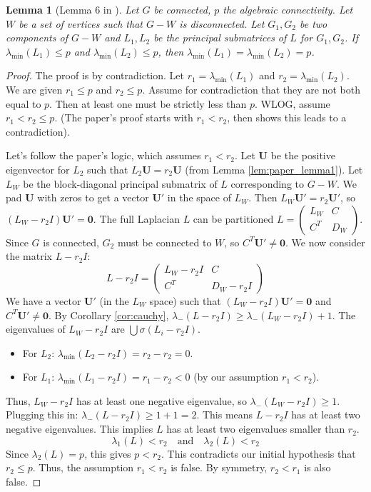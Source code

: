 \documentclass[12pt,a4paper]{report}
\theoremstyle{plain}
\newtheorem{lemma}[theorem]{Lemma}
\theoremstyle{definition}
\theoremstyle{remark}
\begin{document}
\begin{lemma}[Lemma 6 in \cite{main_paper}]
Let $G$ be connected, $p$ the algebraic connectivity. Let $W$ be a set of vertices such that $G-W$ is disconnected. Let $G_1, G_2$ be two components of $G-W$ and $L_1, L_2$ be the principal submatrices of $L$ for $G_1, G_2$. If $\lambda_{\min}(L_1) \le p$ and $\lambda_{\min}(L_2) \le p$, then $\lambda_{\min}(L_1) = \lambda_{\min}(L_2) = p$.
\end{lemma}
\begin{proof}
The proof is by contradiction. Let $r_1 = \lambda_{\min}(L_1)$ and $r_2 = \lambda_{\min}(L_2)$.
We are given $r_1 \le p$ and $r_2 \le p$.
Assume for contradiction that they are not both equal to $p$. Then at least one must be strictly less than $p$. WLOG, assume $r_1 < r_2 \le p$. (The paper's proof starts with $r_1 < r_2$, then shows this leads to a contradiction).

Let's follow the paper's logic, which assumes $r_1 < r_2$. Let $\bm{U}$ be the positive eigenvector for $L_2$ such that $L_2 \bm{U} = r_2 \bm{U}$ (from Lemma \ref{lem:paper_lemma1}).
Let $L_W$ be the block-diagonal principal submatrix of $L$ corresponding to $G-W$.
We pad $\bm{U}$ with zeros to get a vector $\bm{U}'$ in the space of $L_W$.
Then $L_W \bm{U}' = r_2 \bm{U}'$, so $(L_W - r_2 I)\bm{U}' = \bm{0}$.
The full Laplacian $L$ can be partitioned $L = \begin{pmatrix} L_W & C \\ C^T & D_W \end{pmatrix}$.
Since $G$ is connected, $G_2$ must be connected to $W$, so $C^T \bm{U}' \ne \bm{0}$.
We now consider the matrix $L - r_2 I$:
$$ L - r_2 I = \begin{pmatrix} L_W - r_2 I & C \\ C^T & D_W - r_2 I \end{pmatrix} $$
We have a vector $\bm{U}'$ (in the $L_W$ space) such that $(L_W - r_2 I)\bm{U}' = \bm{0}$ and $C^T \bm{U}' \ne \bm{0}$.
By Corollary \ref{cor:cauchy}, $\lambda_-(L - r_2 I) \ge \lambda_-(L_W - r_2 I) + 1$.
The eigenvalues of $L_W - r_2 I$ are $\bigcup \sigma(L_i - r_2 I)$.
\begin{itemize}
    \item For $L_2$: $\lambda_{\min}(L_2 - r_2 I) = r_2 - r_2 = 0$.
    \item For $L_1$: $\lambda_{\min}(L_1 - r_2 I) = r_1 - r_2 < 0$ (by our assumption $r_1 < r_2$).
\end{itemize}
Thus, $L_W - r_2 I$ has at least one negative eigenvalue, so $\lambda_-(L_W - r_2 I) \ge 1$.
Plugging this in: $\lambda_-(L - r_2 I) \ge 1 + 1 = 2$.
This means $L - r_2 I$ has at least two negative eigenvalues. This implies $L$ has at least two eigenvalues smaller than $r_2$.
$$ \lambda_1(L) < r_2 \quad \text{and} \quad \lambda_2(L) < r_2 $$
Since $\lambda_2(L) = p$, this gives $p < r_2$.
This contradicts our initial hypothesis that $r_2 \le p$.
Thus, the assumption $r_1 < r_2$ is false. By symmetry, $r_2 < r_1$ is also false.


\end{proof}
\end{document}
